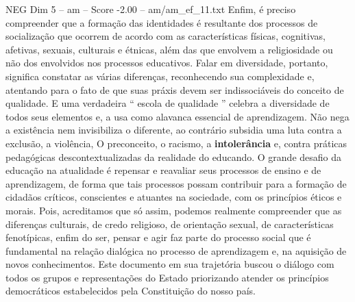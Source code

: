 \begin{textsample}{NEG Dim 5 – am – Score -2.00 – am/am\_ef\_11.txt}
Enfim, é preciso compreender que a formação das identidades é resultante dos processos de socialização que ocorrem de acordo com as características físicas, cognitivas, afetivas, sexuais, culturais e étnicas, além das que envolvem a religiosidade ou não dos envolvidos nos processos educativos.
Falar em diversidade, portanto, significa constatar as várias diferenças, reconhecendo sua complexidade e, atentando para o fato de que suas práxis devem ser indissociáveis do conceito de qualidade.
E uma verdadeira “ escola de qualidade ” celebra a diversidade de todos seus elementos e, a usa como alavanca essencial de aprendizagem.
Não nega a existência nem invisibiliza o diferente, ao contrário subsidia uma luta contra a exclusão, a violência, O preconceito, o racismo, a \textbf{intolerância} e, contra práticas pedagógicas descontextualizadas da realidade do educando.
O grande desafio da educação na atualidade é repensar e reavaliar seus processos de ensino e de aprendizagem, de forma que tais processos possam contribuir para a formação de cidadãos críticos, conscientes e atuantes na sociedade, com os princípios éticos e morais.
Pois, acreditamos que só assim, podemos realmente compreender que as diferenças culturais, de credo religioso, de orientação sexual, de características fenotípicas, enfim do ser, pensar e agir faz parte do processo social que é fundamental na relação dialógica no processo de aprendizagem e, na aquisição de novos conhecimentos.
Este documento em sua trajetória buscou o diálogo com todos os grupos e representações do Estado priorizando atender os princípios democráticos estabelecidos pela Constituição do nosso país.

\end{textsample}
